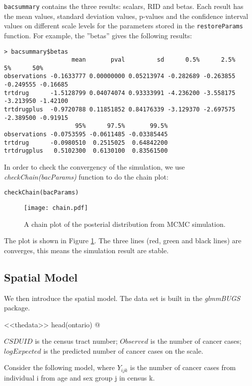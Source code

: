 \documentclass{article}
\begin{document}
\verb!bacsummary! contains the three results: scalars, RID and betas. Each result has the mean values, standard deviation values, p-values and the confidence interval values on different scale levels for the parameters stored in the \verb!restoreParams! function. 
For example, the ''betas'' gives the following results:
\begin{verbatim}
> bacsummary$betas
                   mean       pval         sd      0.5%      2.5%        5%      50%
observations -0.1633777 0.00000000 0.05213974 -0.282689 -0.263855 -0.249555 -0.16685
trtdrug      -1.5128799 0.04074074 0.93333991 -4.236200 -3.558175 -3.213950 -1.42100
trtdrugplus  -0.9720788 0.11851852 0.84176339 -3.129370 -2.697575 -2.389500 -0.91915
                    95%      97.5%       99.5%
observations -0.0753595 -0.0611485 -0.03385445
trtdrug      -0.0980510  0.2515025  0.64842200
trtdrugplus   0.5102300  0.6130100  0.83561500

\end{verbatim}
 

In order to check the convergency of the simulation, we use \textit{checkChain(bacParams)} function to do the chain plot:
\begin{verbatim}
checkChain(bacParams)
\end{verbatim}



\begin{figure}[ht]
\begin{center}
\texttt{[image: chain.pdf]}
\caption{A chain plot of the posterial distribution from MCMC simulation.}\label{chain}
\end{center}
\end{figure}

The plot is shown in Figure \ref{chain}. The three lines (red, green and black lines) are converges, this means the simulation result are stable. 

\subsection{Spatial Model} 
We then introduce the spatial model. The data set is built in the \textit{glmmBUGS} package. 

<<thedata>>
head(ontario)
@

$CSDUID$ is the census tract number; $Observed$ is the number of cancer cases; $logExpected$ is the predicted number of cancer cases on the \log scale.

Consider the following model, where $Y_{ijk}$ is the number of cancer cases from individual i from age and sex group j in census k.  
\end{document}
